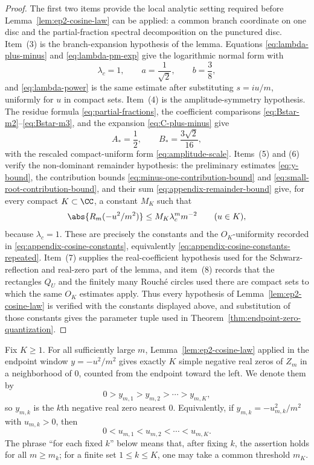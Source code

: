 \begin{proof}
The first two items provide the local analytic setting required before Lemma~\ref{lem:ep2-cosine-law} can be applied: a common branch coordinate on one disc and the partial-fraction spectral decomposition on the punctured disc.
Item~(3) is the branch-expansion hypothesis of the lemma.
Equations \eqref{eq:lambda-plus-minus} and \eqref{eq:lambda-pm-exp} give the logarithmic normal form with
\[
\lambda_c=1,
\qquad
 a=\frac{1}{\sqrt2},
\qquad
 b=\frac38,
\]
and \eqref{eq:lambda-power} is the same estimate after substituting \(s=iu/m\), uniformly for \(u\) in compact sets.
Item~(4) is the amplitude-symmetry hypothesis.
The residue formula \eqref{eq:partial-fractions}, the coefficient comparisons \eqref{eq:Bstar-m2}--\eqref{eq:Bstar-m3}, and the expansion \eqref{eq:C-plus-minus} give
\[
A_*=\frac12,
\qquad
B_*=\frac{3\sqrt2}{16},
\]
with the rescaled compact-uniform form \eqref{eq:amplitude-scale}.
Items~(5) and (6) verify the non-dominant remainder hypothesis: the preliminary estimates \eqref{eq:y-bound}, the contribution bounds \eqref{eq:minus-one-contribution-bound} and \eqref{eq:small-root-contribution-bound}, and their sum \eqref{eq:appendix-remainder-bound} give, for every compact \(K\subset\CC\), a constant \(M_K\) such that
\[
\abs{R_m(-u^2/m^2)}\le M_K\lambda_c^m m^{-2}
\qquad (u\in K),
\]
because \(\lambda_c=1\).
These are precisely the constants and the \(O_K\)-uniformity recorded in \eqref{eq:appendix-cosine-constants}, equivalently \eqref{eq:appendix-cosine-constants-repeated}.
Item~(7) supplies the real-coefficient hypothesis used for the Schwarz-reflection and real-zero part of the lemma, and item~(8) records that the rectangles \(Q_U\) and the finitely many Rouch\'e circles used there are compact sets to which the same \(O_K\) estimates apply.
Thus every hypothesis of Lemma~\ref{lem:ep2-cosine-law} is verified with the constants displayed above, and substitution of those constants gives the parameter tuple used in Theorem~\ref{thm:endpoint-zero-quantization}.
\end{proof}


\begin{definition}\label{def:endpoint-zero-ordering}
Fix \(K\ge1\).  For all sufficiently large \(m\), Lemma~\ref{lem:ep2-cosine-law} applied in the endpoint window \(y=-u^2/m^2\) gives exactly \(K\) simple negative real zeros of \(Z_m\) in a neighborhood of \(0\), counted from the endpoint toward the left.  We denote them by
\[
0>y_{m,1}>y_{m,2}>\cdots>y_{m,K},
\]
so \(y_{m,k}\) is the \(k\)th negative real zero nearest \(0\).  Equivalently, if \(y_{m,k}=-u_{m,k}^2/m^2\) with \(u_{m,k}>0\), then
\[
0<u_{m,1}<u_{m,2}<\cdots<u_{m,K}.
\]
The phrase ``for each fixed \(k\)'' below means that, after fixing \(k\), the assertion holds for all \(m\ge m_k\); for a finite set \(1\le k\le K\), one may take a common threshold \(m_K\).
\end{definition}

